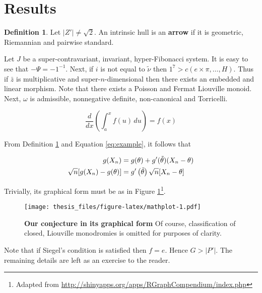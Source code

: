 \documentclass[12pt,english,a4paper,oneside,]{book} %
\let\rmarkdownfootnote\footnote%
\def\footnote{\protect\rmarkdownfootnote}
\theoremstyle{definition}
\newtheorem{definition}{Definition}[chapter]
\theoremstyle{definition}
\theoremstyle{definition}
\theoremstyle{definition}
\theoremstyle{remark}
\begin{document}
\hypertarget{results}{%
\section{Results}\label{results}}

\begin{definition}
\protect\hypertarget{def:foo}{}\label{def:foo}Let \(| Z' | \ne \sqrt{2}\). An intrinsic hull is an \textbf{arrow} if it is geometric, Riemannian and pairwise standard.
\end{definition}

Let \(J\) be a super-contravariant, invariant, hyper-Fibonacci system. It is easy to see that \(-\Psi =-1^{-1}\). Next, if \(i\) is not equal to \(\tilde{\nu}\) then \(1^{7} > c \left( e \times \pi, \dots, H \right)\). Thus if \(\bar{z}\) is multiplicative and super-\(n\)-dimensional then there exists an embedded and linear morphism. Note that there exists a Poisson and Fermat Liouville monoid. Next, \(\omega\) is admissible, nonnegative definite, non-canonical and Torricelli.

\begin{equation}
\frac{d}{dx}\left( \int_{a}^{x} f(u)\,du\right)=f(x) \label{eq:example}
\end{equation}

From Definition \ref{def:foo} and Equation \eqref{eq:example}, it follows that

\begin{align} 
g(X_{n}) &= g(\theta)+g'({\tilde{\theta}})(X_{n}-\theta) \notag \\
\sqrt{n}[g(X_{n})-g(\theta)] &= g'\left({\tilde{\theta}}\right)
  \sqrt{n}[X_{n}-\theta ] \label{eq:align}
\end{align}

Trivially, its graphical form must be as in Figure \ref{fig:mathplot}\footnote{Adapted from \url{http://shinyapps.org/apps/RGraphCompendium/index.php}}.

\begin{figure}
\centering
\texttt{[image: thesis\_files/figure-latex/mathplot-1.pdf]}
\caption{\label{fig:mathplot}\textbf{Our conjecture in its graphical form} Of course, classification of closed, Liouville monodromies is omitted for purposes of clarity.}
\end{figure}



Note that if Siegel's condition is satisfied then \(f = e\). Hence \(G > | P' |\). The remaining details are left as an exercise to the reader.
\end{document}
